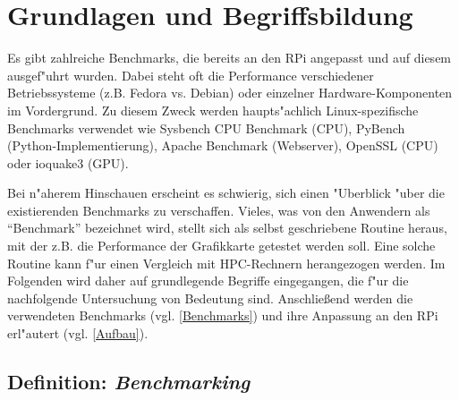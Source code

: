 \chapter{Grundlagen und Begriffsbildung}\label{Kapitel 2}

Es gibt zahlreiche Benchmarks, die bereits an den RPi angepasst und auf diesem ausgef"uhrt wurden. Dabei steht oft die Performance verschiedener Betriebssysteme (z.B. Fedora vs. Debian) oder einzelner Hardware-Komponen\-ten im Vordergrund. Zu diesem Zweck werden haupts"achlich Linux-spezifische Benchmarks verwendet wie Sysbench CPU Benchmark (CPU), PyBench (Python-Implementierung), Apache Benchmark (Webserver), Open\-SSL (CPU) oder ioquake3 (GPU). 

Bei n"aherem Hinschauen erscheint es schwierig, sich einen "Uberblick "uber die existierenden Benchmarks zu verschaffen. Vieles, was von den Anwendern als "`Benchmark"' bezeichnet wird, stellt sich als selbst geschriebene Routine heraus, mit der z.B. die Performance der Grafikkarte getestet werden soll. Eine solche Routine kann f"ur einen Vergleich mit HPC-Rechnern herangezogen werden. Im Folgenden wird daher auf grundlegende Begriffe eingegangen, die f"ur die nachfolgende Untersuchung von Bedeutung sind. Anschlie\ss end werden die verwendeten Benchmarks (vgl. \ref{Benchmarks}) und ihre Anpassung an den RPi erl"autert (vgl. \ref{Aufbau}). 

\section{Definition: \textit{Benchmarking}}\label{Benchmarking}


